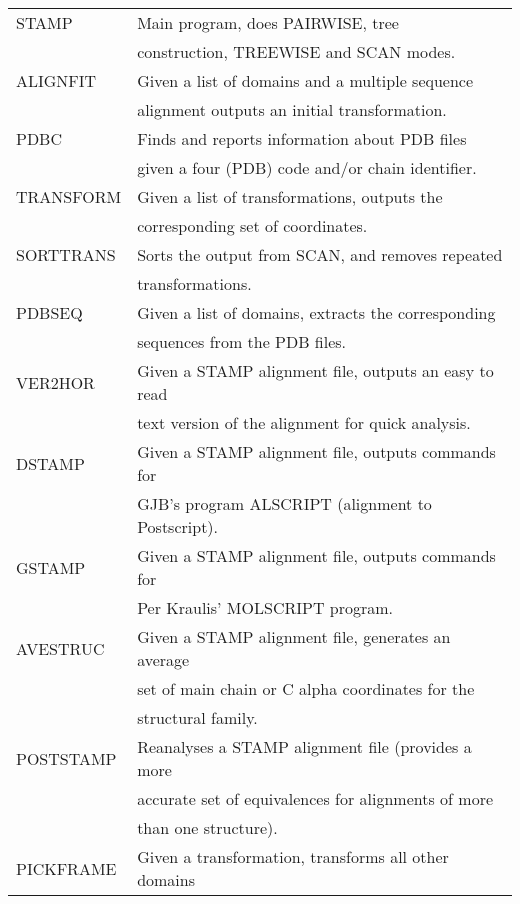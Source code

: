 \begin{center}
\begin{tabular}{|ll|}
\hline
STAMP   &   Main program, does PAIRWISE, tree \\
        &   construction, TREEWISE and SCAN modes.\\
\hline
ALIGNFIT &   Given a list of domains and a multiple sequence \\   
        &      alignment outputs an initial transformation.\\
\hline
PDBC    &    Finds and reports information about PDB files\\
        &     given a four (PDB) code and/or chain identifier.\\ 
\hline
TRANSFORM  & Given a list of transformations, outputs the\\ 
            & corresponding set of coordinates.\\
\hline
SORTTRANS & Sorts the output from SCAN, and removes repeated \\ 
          &   transformations. \\
\hline
PDBSEQ   & Given a list of domains, extracts the corresponding \\
         &    sequences from the PDB files.\\
\hline
VER2HOR  & Given a STAMP alignment file, outputs an easy to read\\
         &    text version of the alignment for quick analysis.\\
\hline
DSTAMP   & Given a STAMP alignment file, outputs commands for\\
         &    GJB's program ALSCRIPT (alignment to Postscript).\\
\hline
GSTAMP   & Given a STAMP alignment file, outputs commands for\\
         &    Per Kraulis' MOLSCRIPT program.\\
\hline
AVESTRUC & Given a STAMP alignment file, generates an average\\
         &    set of main chain or C alpha coordinates for the \\
         &    structural family.\\
\hline
POSTSTAMP & Reanalyses a STAMP alignment file (provides a more\\
          &   accurate set of equivalences for alignments of more\\
          &   than one structure).\\
\hline
PICKFRAME & Given a transformation, transforms all other domains \\ 

\end{tabular}
\end{center}
